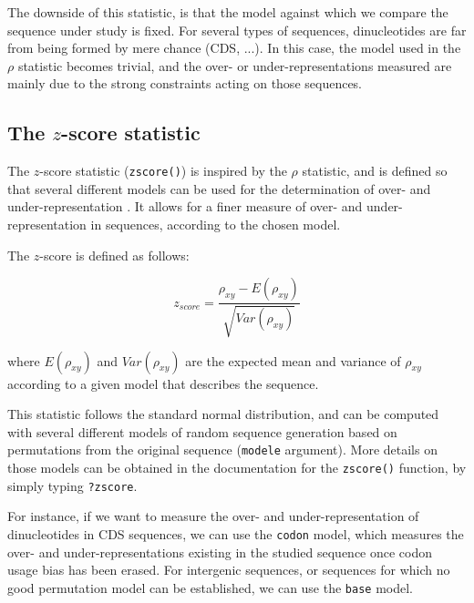 \documentclass{article}
\begin{document}
\begin{figure}
\centering{}
\end{figure}

The downside of this statistic, is that the model against which we
compare the sequence under study is fixed. For several types of
sequences, dinucleotides are far from being formed by mere chance
(CDS, ...). In this case, the model used in the $\rho$ statistic
becomes trivial, and the over- or under-representations measured are
mainly due to the strong constraints acting on those sequences.

\subsection{The $z$-score statistic}

The $z$-score statistic (\texttt{zscore()}) is inspired by the
$\rho$ statistic, and is defined so that several different models can
be used for the determination of over- and under-representation
\cite{UV}. It allows for a finer measure of over- and
under-representation in sequences, according to the chosen model.

The $z$-score is defined as follows:

$$z_{score}=\frac{\rho_{xy}-E(\rho_{xy})}{\sqrt{Var(\rho_{xy})}}$$

where $E(\rho_{xy})$ and $Var(\rho_{xy})$ are the expected mean and
variance of $\rho_{xy}$ according to a given model that describes the
sequence.

This statistic follows the standard normal distribution, and can be
computed with several different models of random sequence generation
based on permutations from the original sequence (\texttt{modele}
argument). More details on those models can be obtained in the
documentation for the \texttt{zscore()} function, by simply typing
\texttt{?zscore}.

For instance, if we want to measure the over- and under-representation
of dinucleotides in CDS sequences, we can use the \texttt{codon}
model, which measures the over- and under-representations existing in
the studied sequence once codon usage bias has been erased. For
intergenic sequences, or sequences for which no good permutation model
can be established, we can use the \texttt{base} model. 
\end{document}
